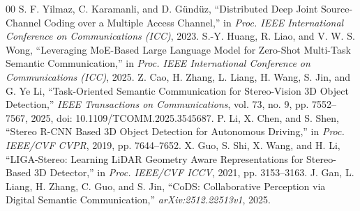 \documentclass[conference]{IEEEtran}
\begin{document}
\begin{thebibliography}{00}
S. F. Yilmaz, C. Karamanli, and D. G\"und\"uz,
``Distributed Deep Joint Source-Channel Coding over a Multiple Access Channel,''
in \emph{Proc. IEEE International Conference on Communications (ICC)}, 2023.
S.-Y. Huang, R. Liao, and V. W. S. Wong,
``Leveraging MoE-Based Large Language Model for Zero-Shot Multi-Task Semantic
Communication,'' in \emph{Proc. IEEE International Conference on
Communications (ICC)}, 2025.
Z. Cao, H. Zhang, L. Liang, H. Wang, S. Jin, and G. Ye Li,
``Task-Oriented Semantic Communication for Stereo-Vision 3D Object Detection,''
\emph{IEEE Transactions on Communications}, vol. 73, no. 9,
pp. 7552--7567, 2025, doi: 10.1109/TCOMM.2025.3545687.
P. Li, X. Chen, and S. Shen,
``Stereo R-CNN Based 3D Object Detection for Autonomous Driving,''
in \emph{Proc. IEEE/CVF CVPR}, 2019, pp. 7644--7652.
X. Guo, S. Shi, X. Wang, and H. Li,
``LIGA-Stereo: Learning LiDAR Geometry Aware Representations for Stereo-Based
3D Detector,'' in \emph{Proc. IEEE/CVF ICCV}, 2021, pp. 3153--3163.
J. Gan, L. Liang, H. Zhang, C. Guo, and S. Jin,
``CoDS: Collaborative Perception via Digital Semantic Communication,''
\emph{arXiv:2512.22513v1}, 2025.
\end{thebibliography}
\end{document}
